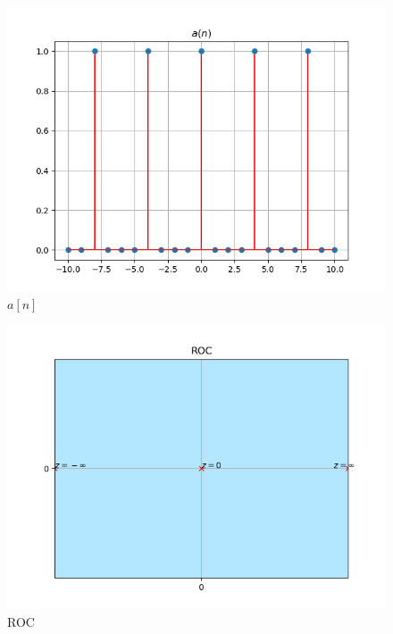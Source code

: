 \documentclass[journal,12pt,twocolumn]{IEEEtran}
\begin{document}
\begin{figure}[!ht]
\centering
 \includegraphics[width=\columnwidth]{Graphs/a.png}
 \caption{$a[n]$}
 \end{figure}
 \begin{figure}[!ht]
\centering
 \includegraphics[width=\columnwidth]{Graphs/ROC.png}
 \caption{ROC}
 \end{figure}
\end{document}

